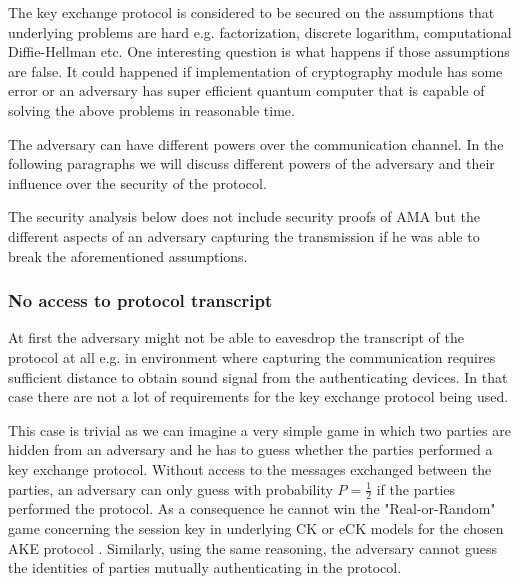 \documentclass[11pt,titlepage]{article}
\theoremstyle{plain}
\begin{document}
\vspace{5mm}

The key exchange protocol is considered to be secured on the assumptions that underlying problems are hard e.g. factorization, discrete logarithm, computational Diffie-Hellman etc. One interesting question is what happens if those assumptions are false. It could happened if implementation of cryptography module has some error or an adversary has super efficient quantum computer that is capable of solving the above problems in reasonable time.

\vspace{5mm}

The adversary can have different powers over the communication channel. In the following paragraphs we will discuss different powers of the adversary and their influence over the security of the protocol.

\vspace{5mm}

The security analysis below does not include security proofs of AMA but the different aspects of an adversary capturing the transmission if he was able to break the aforementioned assumptions.

\subsubsection{No access to protocol transcript}
At first the adversary might not be able to eavesdrop the transcript of the protocol at all e.g. in environment where capturing the communication requires sufficient distance to obtain sound signal from the authenticating devices. In that case there are not a lot of requirements for the key exchange protocol being used.

\vspace{5mm}

This case is trivial as we can imagine a very simple game in which two parties are hidden from an adversary and he has to guess whether the parties performed a key exchange protocol. Without access to the messages exchanged between the parties, an adversary can only guess with probability $P = \frac{1}{2}$ if the parties performed the protocol. As a consequence he cannot win the "Real-or-Random" game concerning the session key in underlying CK or eCK models for the chosen AKE protocol \cite{key_exchange, efficient_eck, security_canetti_krawczyk}. Similarly, using the same reasoning, the adversary cannot guess the identities of parties mutually authenticating in the protocol. 
\end{document}
